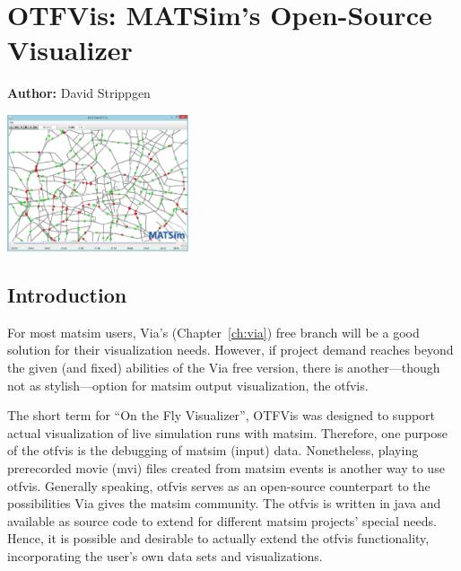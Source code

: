 \chapter{OTFVis: MATSim's Open-Source Visualizer}
\label{ch:otfvis}

\hfill \textbf{Author:} David Strippgen

\begin{center} \includegraphics[width=0.4\textwidth, angle=0]{extending/figures/otfvis/image06.png} \end{center}



\section{Introduction}
For most \gls{matsim} users, Via's (Chapter~\ref{ch:via}) free branch will be a good solution for their visualization needs. However, if project demand reaches beyond the given (and fixed) abilities of the Via free version, there is another---though not as stylish---option for \gls{matsim} output visualization, the \gls{otfvis}. 

The short term for ``On the Fly Visualizer'', OTFVis was designed to support actual visualization of live simulation runs with \gls{matsim}. Therefore, one purpose of the \gls{otfvis} is the debugging of \gls{matsim} (input) data. Nonetheless, playing prerecorded movie (\gls{mvi}) files created from \gls{matsim} events is another way to use \gls{otfvis}. Generally speaking, \gls{otfvis} serves as an open-source counterpart to the possibilities Via gives the \gls{matsim} community. The \gls{otfvis} is written in \gls{java} and available as source code to extend for different \gls{matsim} projects' special needs. Hence, it is possible and desirable to actually extend the \gls{otfvis} functionality, incorporating the user's own data sets and visualizations.

